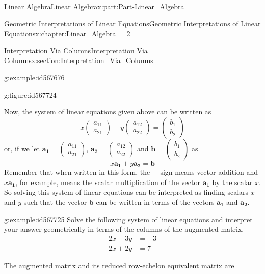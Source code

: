 \documentclass[oneside,10pt,]{book}
\numberwithin{equation}{section}
\newcommand{\amp}{&}
\begin{document}
\begin{partptx}{Linear Algebra}{}{Linear Algebra}{}{}{x:part:Part-Linear_Algebra}
\begin{chapterptx}{Geometric Interpretations of Linear Equations}{}{Geometric Interpretations of Linear Equations}{}{}{x:chapter:Linear_Algebra__2}
\begin{sectionptx}{Interpretation Via Columns}{}{Interpretation Via Columns}{}{}{x:section:Interpretation_Via_Columns}
\begin{example}{}{g:example:id567676}
\begin{figureptx}{}{g:figure:id567724}{}
\end{figureptx}%
%
\end{example}
Now, the system of linear equations given above can be written as%
\begin{equation*}
x \begin{pmatrix} a_{11} \\ a_{21} \end{pmatrix} +y \begin{pmatrix} a_{12} \\ a_{22} \end{pmatrix} = \begin{pmatrix} b_{1} \\ b_{2} \end{pmatrix} 
\end{equation*}
or, if we let \(\mathbf{a_1} =\begin{pmatrix} a_{11} \\ a_{21} \end{pmatrix} \), \(\mathbf{a_2}= \begin{pmatrix} a_{12} \\ a_{22} \end{pmatrix} \) and \(\mathbf{b} =\begin{pmatrix} b_{1} \\ b_{2} \end{pmatrix} \) as%
\begin{equation*}
x\mathbf{a_1}+y\mathbf{a_2}=\mathbf{b}
\end{equation*}
Remember that when written in this form, the \(+\) sign means vector addition and \(x\mathbf{a_1}\), for example, means the scalar multiplication of the vector \(\mathbf{a_1}\) by the scalar \(x\). So solving this system of linear equations can be interpreted as finding scalars \(x\) and \(y\) such that the vector \(\mathbf{b}\) can be written in terms of the vectors \(\mathbf{a_1}\) and \(\mathbf{a_2}\).%
\begin{example}{}{g:example:id567725}%
Solve the following system of linear equations and interpret your answer geometrically in terms of the columns of the augmented matrix.%
\begin{align*}
2x-3y \amp =-3\\
2x+2y \amp = 7
\end{align*}
%
\par\smallskip%
\noindent\hypertarget{g:solution:id567797}{}The augmented matrix and its reduced row-echelon equivalent matrix are%
\begin{equation*}

\end{equation*}
\end{example}
\end{sectionptx}
\end{chapterptx}
\end{partptx}
\end{document}
